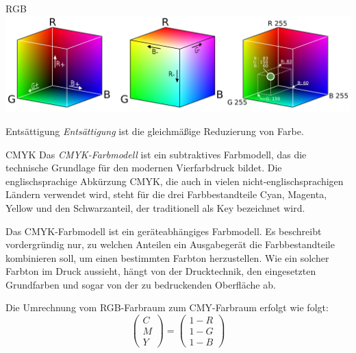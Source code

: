 \begin{defi}[Farbmodell]{RGB}
    \centering
    \includegraphics[width=.7\linewidth]{figures/RGB_color_cube.png}
\end{defi}

\begin{defi}{Entsättigung}
    \emph{Entsättigung} ist die gleichmäßige Reduzierung von Farbe.
\end{defi}

\begin{defi}[Farbmodell]{CMYK}
    Das \emph{CMYK-Farbmodell} ist ein subtraktives Farbmodell, das die technische Grundlage für den modernen Vierfarbdruck bildet.
    Die englischsprachige Abkürzung CMYK, die auch in vielen nicht-englischsprachigen Ländern verwendet wird, steht für die drei Farbbestandteile Cyan, Magenta, Yellow und den Schwarzanteil, der traditionell als Key bezeichnet wird.

    Das CMYK-Farbmodell ist ein geräteabhängiges Farbmodell.
    Es beschreibt vordergründig nur, zu welchen Anteilen ein Ausgabegerät die Farbbestandteile kombinieren soll, um einen bestimmten Farbton herzustellen. Wie ein solcher Farbton im Druck aussieht, hängt von der Drucktechnik, den eingesetzten Grundfarben und sogar von der zu bedruckenden Oberfläche ab.

    Die Umrechnung vom RGB-Farbraum zum CMY-Farbraum erfolgt wie folgt:
    \[
        \begin{pmatrix}
            C \\ M \\ Y
        \end{pmatrix}
        =
        \begin{pmatrix}
            1 - R \\
            1 - G \\
            1 - B
        \end{pmatrix}
    \]


\end{defi}
